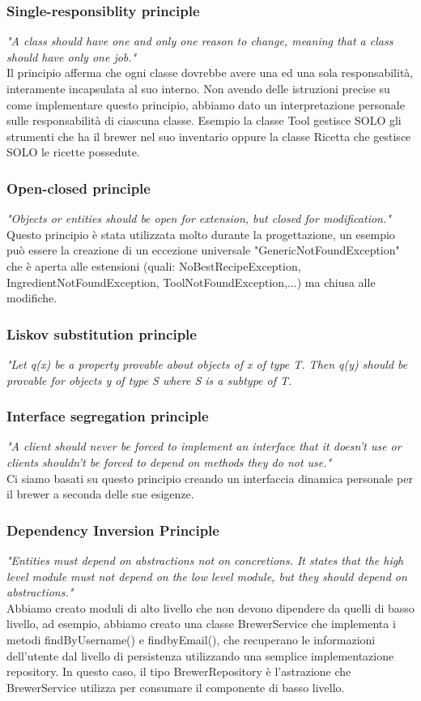 \documentclass{article}
\begin{document}
\subsubsection{Single-responsiblity principle}
\textit{"A class should have one and only one reason to change, meaning that a class should have only one job."} \\
Il principio afferma che ogni classe dovrebbe avere una ed una sola responsabilità, interamente incapsulata al suo interno. Non avendo delle istruzioni precise su come implementare questo principio, abbiamo dato un interpretazione personale sulle responsabilità di ciascuna classe. Esempio la classe Tool gestisce SOLO gli strumenti che ha il brewer nel suo inventario oppure la classe Ricetta che gestisce SOLO le ricette possedute.
\subsubsection{Open-closed principle}
\textit{"Objects or entities should be open for extension, but closed for modification."}
Questo principio è stata utilizzata molto durante la progettazione, un esempio può essere la creazione di un eccezione universale "GenericNotFoundException" che è aperta alle estensioni (quali: NoBestRecipeException, IngredientNotFoundException, ToolNotFoundException,...) ma chiusa alle modifiche.
\subsubsection{Liskov substitution principle}
\textit{"Let q(x) be a property provable about objects of x of type T. Then q(y) should be provable for objects y of type S where S is a subtype of T.}
\subsubsection{Interface segregation principle}
\textit{"A client should never be forced to implement an interface that it doesn’t use or clients shouldn’t be forced to depend on methods they do not use."}\\
Ci siamo basati su questo principio creando un interfaccia dinamica personale per il brewer a seconda delle sue esigenze.
\subsubsection{Dependency Inversion Principle}
\textit{"Entities must depend on abstractions not on concretions. It states that the high level module must not depend on the low level module, but they should depend on abstractions."}\\
Abbiamo creato moduli di alto livello che non devono dipendere da quelli di basso livello, ad esempio, abbiamo creato una classe BrewerService che implementa i metodi findByUsername() e findbyEmail(), che recuperano le informazioni dell'utente dal livello di persistenza utilizzando una semplice implementazione repository. In questo caso, il tipo BrewerRepository è l'astrazione che BrewerService utilizza per consumare il componente di basso livello.
\end{document}
